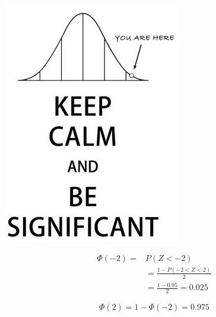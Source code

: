 \documentclass[slidestop,compress,mathserif]{beamer}
\begin{document}
\begin{frame}
\frametitle{}

{
\begin{center}
\includegraphics[width=\textwidth]{figures/keep_calm2}
\end{center}
}
{


\pause
\begin{align*}
\Phi(-2) = & P(Z < -2) \\
& = \frac{1- P(-2 < Z < 2)}{2} \\
& = \frac{1-0.95}{2} = 0.025
\end{align*}

\pause
\[ \Phi(2) = 1 - \Phi(-2) = 0.975 \]


}
\end{frame}
\end{document}
